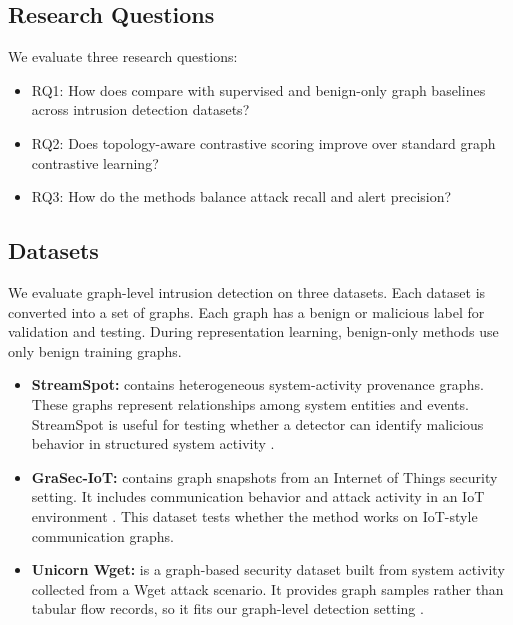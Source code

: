\subsection{Research Questions}

We evaluate three research questions:

\begin{itemize}
    \item RQ1: How does \sysname{} compare with supervised and benign-only graph baselines across intrusion detection datasets?

    \item RQ2: Does topology-aware contrastive scoring improve over standard graph contrastive learning?

    \item RQ3: How do the methods balance attack recall and alert precision?
\end{itemize}

\subsection{Datasets}

We evaluate graph-level intrusion detection on three datasets. Each dataset is converted into a set of graphs. Each graph has a benign or malicious label for validation and testing. During representation learning, benign-only methods use only benign training graphs.

\begin{itemize}
    \item \textbf{StreamSpot:} contains heterogeneous system-activity provenance graphs. These graphs represent relationships among system entities and events. StreamSpot is useful for testing whether a detector can identify malicious behavior in structured system activity \cite{manzoor2016streamspot}.

    \item \textbf{GraSec-IoT:} contains graph snapshots from an Internet of Things security setting. It includes communication behavior and attack activity in an IoT environment \cite{hamouche2024graseciot}. This dataset tests whether the method works on IoT-style communication graphs.

    \item \textbf{Unicorn Wget:} is a graph-based security dataset built from system activity collected from a Wget attack scenario. It provides graph samples rather than tabular flow records, so it fits our graph-level detection setting \cite{unicornwget}.
\end{itemize}

